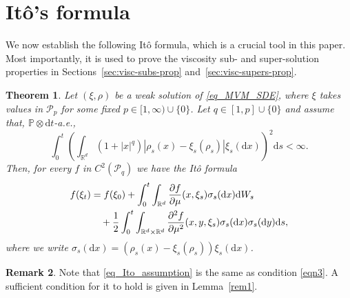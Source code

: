 \documentclass{article}
\newtheorem{theorem}{Theorem}[section]
\theoremstyle{definition}
\newtheorem{remark}[theorem]{\textbf{Remark}}
\newtheorem{example}[theorem]{\textbf{Example}}
\numberwithin{equation}{section}
\numberwithin{theorem}{section}
\renewcommand{\P}{\mathbb{P}}
\newcommand{\R}{\mathbb{R}}
\newcommand{\dx}{\mathrm{d}x}
\newcommand{\dy}{\mathrm{d}y}
\newcommand{\ds}{\mathrm{d}s}
\newcommand{\dt}{\mathrm{d}t}
\newcommand{\Cov}{\mathbb{C}\mathrm{ov}}
\renewcommand{\d}{{\rm d}}
\renewcommand{\P}{{\mathbb P}}
\newcommand{\Fcal}{{\mathcal F}}
\newcommand{\Pcal}{{\mathcal P}}
\begin{document}
\section{It\^o's formula} \label{S_Ito}
\label{sec:itos-formula}

We now establish the following It\^o formula, which is a crucial tool in this paper. Most importantly, it is used to prove the viscosity sub- and super-solution properties in Sections~\ref{sec:visc-subs-prop} and~\ref{sec:visc-supers-prop}.

\begin{theorem}\label{T_Ito}
Let $(\xi,\rho)$ be a \emph{weak solution} of \eqref{eq_MVM_SDE}, where $\xi$ takes values in $\Pcal_p$ for some fixed $p \in [1,\infty) \cup \{0\}$.
Let $q \in [1,p] \cup \{0\}$ and assume that, $\P\otimes \dt$-a.e., 
\begin{equation}\label{eq_Ito_assumption}
\int_0^t \left( \int_{\R^d} (1 + |x|^q) |\rho_s(x) - \xi_s(\rho_s)| \xi_s(\dx) \right)^2 \ds < \infty.
\end{equation}
Then, for every $f$ in $C^2(\Pcal_q)$ we have the It\^o formula
\begin{equation}\label{eq:ito_general_NEW}
\begin{aligned}
f(\xi_t) &= f(\xi_0) + \int_0^t \int_{\R^d} \frac{\partial f}{\partial \mu}(x,\xi_s)\sigma_s(\dx) \d W_s \\
&\quad + \frac12 \int_0^t \int_{{\R^d}\times {\R^d}} \frac{\partial^2 f}{\partial \mu^2}(x,y,\xi_s) \sigma_s(\dx)\sigma_s(\dy) \ds,
\end{aligned}
\end{equation}
where we write $\sigma_s(\dx)=(\rho_s(x)-\xi_s(\rho_s))\xi_s(\dx)$.
\end{theorem}

\begin{remark}
Note that \eqref{eq_Ito_assumption} is the same as condition \eqref{eqn3}. A sufficient condition for it to hold is given in Lemma~\ref{rem1}.
\end{remark}
\end{document}
